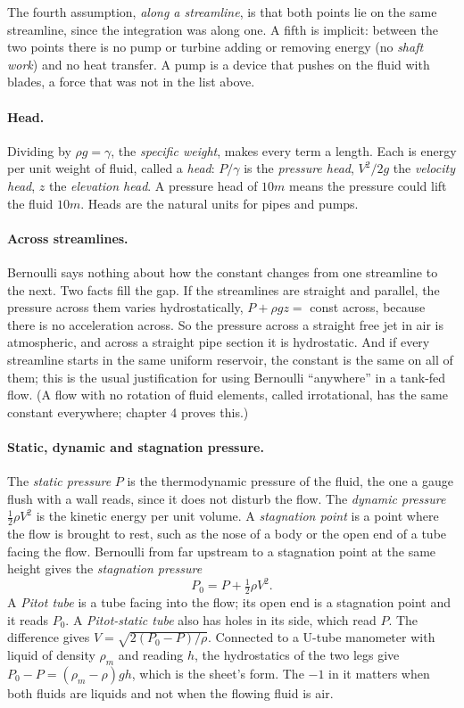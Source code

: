 The fourth assumption, \emph{along a streamline}, is that both points lie on the same streamline, since the integration was along one. A fifth is implicit: between the two points there is no pump or turbine adding or removing energy (no \emph{shaft work}) and no heat transfer. A pump is a device that pushes on the fluid with blades, a force that was not in the list above.

\paragraph{Head.} Dividing by $\rho g = \gamma$, the \emph{specific weight}, makes every term a length. Each is energy per unit weight of fluid, called a \emph{head}: $P/\gamma$ is the \emph{pressure head}, $V^2/2g$ the \emph{velocity head}, $z$ the \emph{elevation head}. A pressure head of $10\unit{m}$ means the pressure could lift the fluid $10\unit{m}$. Heads are the natural units for pipes and pumps.

\paragraph{Across streamlines.} Bernoulli says nothing about how the constant changes from one streamline to the next. Two facts fill the gap. If the streamlines are straight and parallel, the pressure across them varies hydrostatically, $P + \rho gz = $ const across, because there is no acceleration across. So the pressure across a straight free jet in air is atmospheric, and across a straight pipe section it is hydrostatic. And if every streamline starts in the same uniform reservoir, the constant is the same on all of them; this is the usual justification for using Bernoulli ``anywhere'' in a tank-fed flow. (A flow with no rotation of fluid elements, called irrotational, has the same constant everywhere; chapter 4 proves this.)

\paragraph{Static, dynamic and stagnation pressure.} The \emph{static pressure} $P$ is the thermodynamic pressure of the fluid, the one a gauge flush with a wall reads, since it does not disturb the flow. The \emph{dynamic pressure} $\tfrac12\rho V^2$ is the kinetic energy per unit volume. A \emph{stagnation point} is a point where the flow is brought to rest, such as the nose of a body or the open end of a tube facing the flow. Bernoulli from far upstream to a stagnation point at the same height gives the \emph{stagnation pressure}
\[
P_0 = P + \tfrac12\rho V^2 .
\]
A \emph{Pitot tube} is a tube facing into the flow; its open end is a stagnation point and it reads $P_0$. A \emph{Pitot-static tube} also has holes in its side, which read $P$. The difference gives $V = \sqrt{2(P_0 - P)/\rho}$. Connected to a U-tube manometer with liquid of density $\rho_m$ and reading $h$, the hydrostatics of the two legs give $P_0 - P = (\rho_m - \rho)gh$, which is the sheet's form. The $-1$ in it matters when both fluids are liquids and not when the flowing fluid is air.

